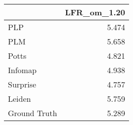\begin{tabular}{lr}
\toprule
{} & LFR_om_1.20 \\
\midrule
PLP          &       5.474 \\
PLM          &       5.658 \\
Potts        &       4.821 \\
Infomap      &       4.938 \\
Surprise     &       4.757 \\
Leiden       &       5.759 \\
Ground Truth &       5.289 \\
\bottomrule
\end{tabular}
